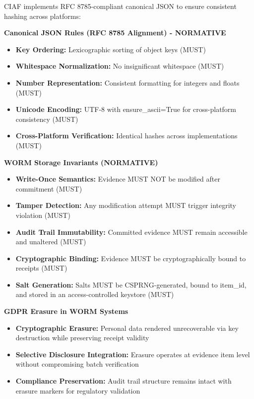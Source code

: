 \documentclass[12pt,a4paper]{article}
\begin{document}
CIAF implements RFC 8785-compliant canonical JSON to ensure consistent hashing across platforms:

\begin{technicalbox}
\textbf{Canonical JSON Rules (RFC 8785 Alignment) - NORMATIVE}
\begin{itemize}
\item \textbf{Key Ordering:} Lexicographic sorting of object keys (MUST)
\item \textbf{Whitespace Normalization:} No insignificant whitespace (MUST)
\item \textbf{Number Representation:} Consistent formatting for integers and floats (MUST)
\item \textbf{Unicode Encoding:} UTF-8 with ensure\_ascii=True for cross-platform consistency (MUST)
\item \textbf{Cross-Platform Verification:} Identical hashes across implementations (MUST)
\end{itemize}

\textbf{WORM Storage Invariants (NORMATIVE)}
\begin{itemize}
\item \textbf{Write-Once Semantics:} Evidence MUST NOT be modified after commitment (MUST)
\item \textbf{Tamper Detection:} Any modification attempt MUST trigger integrity violation (MUST)
\item \textbf{Audit Trail Immutability:} Committed evidence MUST remain accessible and unaltered (MUST)
\item \textbf{Cryptographic Binding:} Evidence MUST be cryptographically bound to receipts (MUST)
\item \textbf{Salt Generation:} Salts MUST be CSPRNG-generated, bound to item\_id, and stored in an access-controlled keystore (MUST)
\end{itemize}

\textbf{GDPR Erasure in WORM Systems}
\begin{itemize}
\item \textbf{Cryptographic Erasure:} Personal data rendered unrecoverable via key destruction while preserving receipt validity
\item \textbf{Selective Disclosure Integration:} Erasure operates at evidence item level without compromising batch verification
\item \textbf{Compliance Preservation:} Audit trail structure remains intact with erasure markers for regulatory validation
\end{itemize}
\end{technicalbox}
\end{document}
